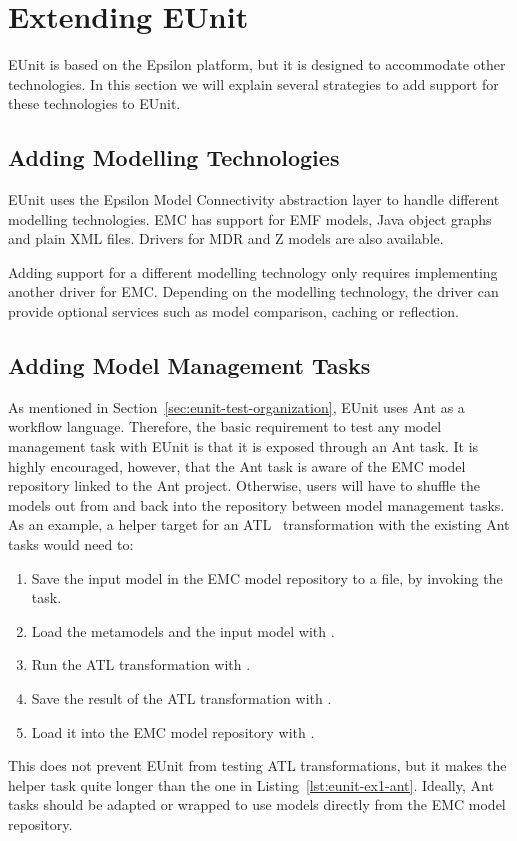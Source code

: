 \section{Extending EUnit}
\label{sec:eunit-extending}

EUnit is based on the Epsilon platform, but it is designed to accommodate other technologies. In this section we will explain several strategies to add support for these technologies to EUnit.

\subsection{Adding Modelling Technologies}
\label{sec:eunit-adding-modell-techn}

EUnit uses the Epsilon Model Connectivity abstraction layer to handle different modelling technologies. EMC has support for EMF models, Java object graphs and plain XML files. Drivers for MDR and Z models are also available.

Adding support for a different modelling technology only requires implementing another driver for EMC. Depending on the modelling technology, the driver can provide optional services such as model comparison, caching or reflection.

\subsection{Adding Model Management Tasks}
\label{sec:eunit-adding-model-manag}

As mentioned in Section~\ref{sec:eunit-test-organization}, EUnit uses Ant as a workflow language. Therefore, the basic requirement to test any model management task with EUnit is that it is exposed through an Ant task. It is highly encouraged, however, that the Ant task is aware of the EMC model repository linked to the Ant project. Otherwise, users will have to shuffle the models out from and back into the repository between model management tasks. As an example, a helper target for an ATL~\cite{ATL} transformation with the existing Ant tasks would need to:

\begin{enumerate}
\item Save the input model in the EMC model repository to a file, by invoking the  task.
\item Load the metamodels and the input model with .
\item Run the ATL transformation with .
\item Save the result of the ATL transformation with .
\item Load it into the EMC model repository with .
\end{enumerate}
This does not prevent EUnit from testing ATL transformations, but it makes the helper task quite longer than the one in Listing~\ref{lst:eunit-ex1-ant}. Ideally, Ant tasks should be adapted or wrapped to use models directly from the EMC model repository.

